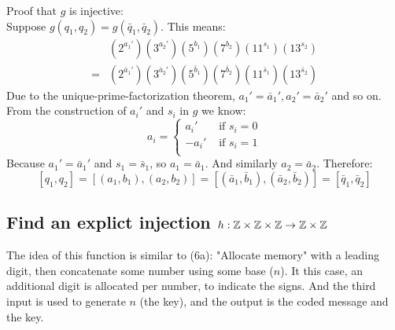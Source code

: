         Proof that $g$ is injective: \\ 
        Suppose $g(q_1,q_2) = g(\bar q_1, \bar q_2)$.
        This means: 
        \begin{align*}
            &(2^{a_1'}) (3^{a_2'}) (5^{b_1}) (7^{b_2}) (11^{s_1}) (13^{s_2})\\
            = &(2^{\bar a_1'}) (3^{\bar a_2'}) (5^{\bar b_1}) (7^{\bar b_2}) (11^{\bar s_1}) (13^{\bar s_2})
        \end{align*}
        Due to the unique-prime-factorization theorem, $a_1' = \bar a_1', a_2' = \bar a_2'$ and so on.
        From the construction of $a_i'$ and $s_i$ in $g$ we know: 
        \[
            a_i = 
            \begin{cases}
                a_i' & \text{ if $s_i = 0$} \\ 
                -a_i' & \text{ if $s_i = 1$} \\ 
            \end{cases}
        \]
        Because $a_1' = \bar a_1'$ and $s_1 = \bar s_1$,
        so $a_1 = \bar a_1$.
        And similarly $a_2 = \bar a_2$.
        Therefore: 
        \[
            [q_1,q_2]
            = [(a_1, b_1), (a_2, b_2)]
            = [(\bar a_1, \bar b_1), (\bar a_2, \bar b_2)]
            = [\bar q_1, \bar q_2]
        \]

        
    
    \subsection{Find an explict injection $h: \mathbb{Z} \times \mathbb{Z} \times \mathbb{Z} \to \mathbb{Z} \times \mathbb{Z}$}
        The idea of this function is similar to (6a): 
        "Allocate memory" with a leading digit, then concatenate some number using some base ($n$).
        It this case, an additional digit is allocated per number, to indicate the signs.
        And the third input is used to generate $n$ (the key),
        and the output is the coded message and the key. 

